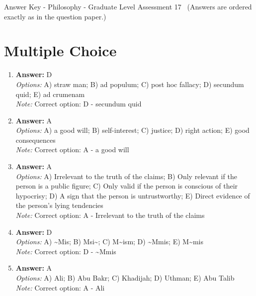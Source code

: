 \documentclass[12pt]{article}
\begin{document}
\begin{center}
Answer Key - Philosophy - Graduate Level Assessment 17 \
\small (Answers are ordered exactly as in the question paper.)
\end{center}

\section*{Multiple Choice}
\begin{enumerate}[label=\arabic*.]
\item \textbf{Answer:} D
\\ \textit{Options:} A) straw man; B) ad populum; C) post hoc fallacy; D) secundum quid; E) ad crumenam
\\ \textit{Note:} Correct option: D - secundum quid
\item \textbf{Answer:} A
\\ \textit{Options:} A) a good will; B) self-interest; C) justice; D) right action; E) good consequences
\\ \textit{Note:} Correct option: A - a good will
\item \textbf{Answer:} A
\\ \textit{Options:} A) Irrelevant to the truth of the claims; B) Only relevant if the person is a public figure; C) Only valid if the person is conscious of their hypocrisy; D) A sign that the person is untrustworthy; E) Direct evidence of the person's lying tendencies
\\ \textit{Note:} Correct option: A - Irrelevant to the truth of the claims
\item \textbf{Answer:} D
\\ \textit{Options:} A) \textasciitilde{}Mis; B) Msi\textasciitilde{}; C) M\textasciitilde{}ism; D) \textasciitilde{}Mmis; E) M\textasciitilde{}mis
\\ \textit{Note:} Correct option: D - \textasciitilde{}Mmis
\item \textbf{Answer:} A
\\ \textit{Options:} A) Ali; B) Abu Bakr; C) Khadijah; D) Uthman; E) Abu Talib
\\ \textit{Note:} Correct option: A - Ali
\end{enumerate}
\end{document}
